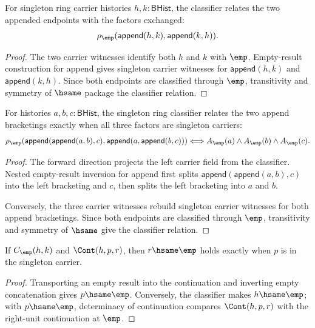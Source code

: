 \begin{theorem}
\label{thm:ring-singleton-classifier-append-comm}
For singleton ring carrier histories $h,k:\mathsf{BHist}$, the classifier
relates the two appended endpoints with the factors exchanged:
$$
\rho_{\emp}(\mathsf{append}(h,k),\mathsf{append}(k,h)).
$$
\end{theorem}
\begin{proof}
The two carrier witnesses identify both $h$ and $k$ with $\emp$.
Empty-result construction for append gives singleton carrier witnesses for
$\mathsf{append}(h,k)$ and $\mathsf{append}(k,h)$. Since both endpoints are
classified through $\emp$, transitivity and symmetry of $\hsame$ package the
classifier relation.
\end{proof}

\begin{theorem}
\label{thm:ring-singleton-classifier-append-assoc-carrier-iff}
For histories $a,b,c:\mathsf{BHist}$, the singleton ring classifier relates
the two append bracketings exactly when all three factors are singleton
carriers:
$$
\rho_{\emp}(\mathsf{append}(\mathsf{append}(a,b),c),
\mathsf{append}(a,\mathsf{append}(b,c)))
\Longleftrightarrow
A_{\emp}(a)\land A_{\emp}(b)\land A_{\emp}(c).
$$
\end{theorem}
\begin{proof}
The forward direction projects the left carrier field from the classifier.
Nested empty-result inversion for append first splits
$\mathsf{append}(\mathsf{append}(a,b),c)$ into the left bracketing and $c$,
then splits the left bracketing into $a$ and $b$.

Conversely, the three carrier witnesses rebuild singleton carrier witnesses
for both append bracketings. Since both endpoints are classified through
$\emp$, transitivity and symmetry of $\hsame$ give the classifier relation.
\end{proof}

\begin{theorem}\label{thm:ring-singleton-classifier-cont-result-empty}
If $C_{\emp}(h,k)$ and $\Cont(h,p,r)$, then $r\hsame\emp$ holds exactly when $p$ is in the singleton carrier.
\end{theorem}
\begin{proof}
Transporting an empty result into the continuation and inverting empty concatenation gives $p\hsame\emp$. Conversely, the classifier makes $h\hsame\emp$; with $p\hsame\emp$, determinacy of continuation compares $\Cont(h,p,r)$ with the right-unit continuation at $\emp$.
\end{proof}

